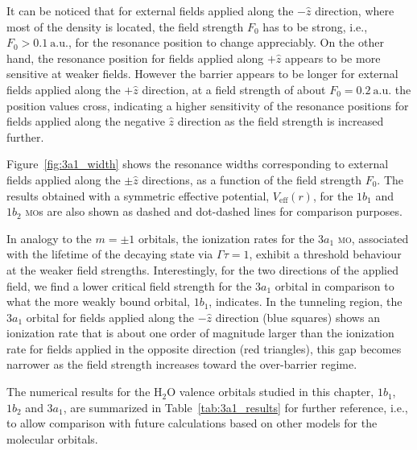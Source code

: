 It can be noticed that for external fields applied along the
$-\hat{z}$ direction, where most of the density is located, the field
strength $F_{0}$ has to be strong, i.e., $F_{0}>0.1\ \mathrm{a.u.}$,
for the resonance position to change appreciably. On the other hand,
the resonance position for fields applied along $+\hat{z}$ appears to
be more sensitive at weaker fields. However the barrier appears to be
longer for external fields applied along the $+\hat{z}$ direction, at
a field strength of about $F_{0} = 0.2\ \mathrm{a.u.}$ the position
values cross, indicating a higher sensitivity of the resonance
positions for fields applied along the negative $\hat{z}$ direction as
the field strength is increased further.

Figure~\ref{fig:3a1_width} shows the resonance widths corresponding to
external fields applied along the $\pm\hat{z}$ directions, as a
function of the field strength $F_{0}$. The results obtained with a
symmetric effective potential, $V_{\mathrm{eff}}(r)$, for the $1b_{1}$
and $1b_{2}$ \textsc{mo}s are also shown as dashed and dot-dashed
lines for comparison purposes.

In analogy to the $m=\pm 1$ orbitals, the ionization rates for the
$3a_{1}$ \textsc{mo}, associated with the lifetime of the decaying
state via $\Gamma\tau=1$, exhibit a threshold behaviour at the weaker
field strengths. Interestingly, for the two directions of the applied
field, we find a lower critical field strength for the $3a_{1}$
orbital in comparison to what the more weakly bound orbital, $1b_{1}$,
indicates.  In the tunneling region, the $3a_{1}$ orbital for fields
applied along the $-\hat{z}$ direction (blue squares) shows an
ionization rate that is about one order of magnitude larger than the
ionization rate for fields applied in the opposite direction (red
triangles), this gap becomes narrower as the field strength increases
toward the over-barrier regime.

The numerical results for the H$_{2}$O valence orbitals studied in
this chapter, $1b_{1}$, $1b_{2}$ and $3a_{1}$, are summarized in
Table~\ref{tab:3a1_results} for further reference, i.e., to allow
comparison with future calculations based on other models for the
molecular orbitals.


